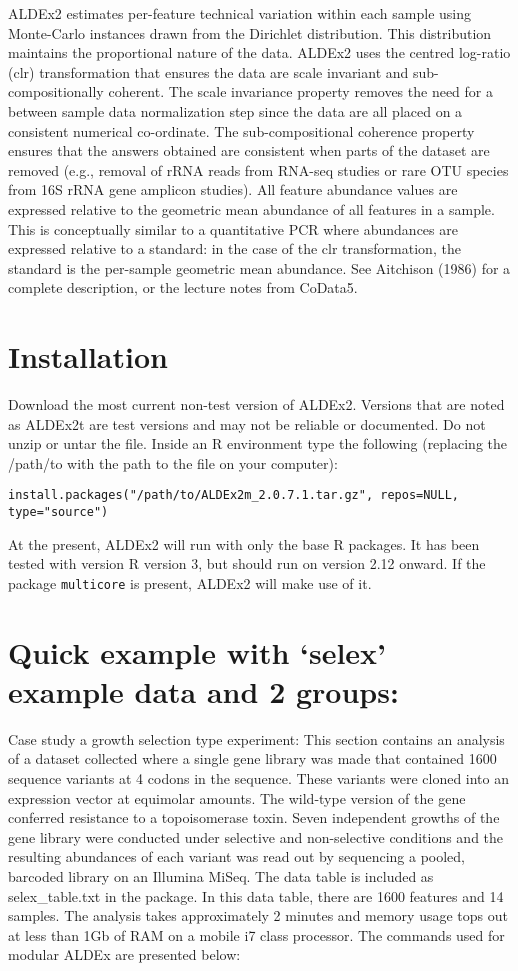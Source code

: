 \documentclass[11pt]{article}
\begin{document}
ALDEx2 estimates per-feature technical variation within each sample using Monte-Carlo instances drawn from the Dirichlet distribution. This distribution maintains the proportional nature of the data. ALDEx2 uses the centred log-ratio (clr) transformation that ensures the data are scale invariant and sub-compositionally coherent\cite{Aitchison:1986}. The scale invariance property removes the need for a between sample data normalization step since the data are all placed on a consistent numerical co-ordinate. The sub-compositional coherence property ensures that the answers obtained are consistent when parts of the dataset are removed (e.g., removal of rRNA reads from  RNA-seq studies or rare OTU species from 16S rRNA gene amplicon studies). All feature abundance values are expressed relative to the geometric mean abundance of all features in a sample. This is conceptually similar to a quantitative PCR where abundances are expressed relative to a standard: in the case of the clr transformation, the standard is the per-sample geometric mean abundance. See Aitchison (1986)\cite{Aitchison:1986} for a complete description, or the lecture notes from CoData5\cite{aitchisonconcise}.

\section{Installation}
Download the most current non-test version of ALDEx2. Versions that are noted as ALDEx2t are test versions and may not be reliable or documented. Do not unzip or untar the file. Inside an R environment type the following  (replacing the /path/to with the path to the file on your computer):
\begin{verbatim}
install.packages("/path/to/ALDEx2m_2.0.7.1.tar.gz", repos=NULL, type="source")
\end{verbatim}
At the present, ALDEx2 will run with only the base R packages. It has been tested with version R version 3, but should run on version 2.12 onward. If the package \texttt{multicore} is present, ALDEx2 will make use of it.

\section{Quick example with `selex' example data and 2 groups:}
Case study a growth selection type experiment\cite{mcmurrough:2014}: This section contains an analysis of a dataset collected where a single gene  library was made that contained 1600 sequence variants at 4 codons in the sequence. These variants were cloned into an expression vector at equimolar amounts. The wild-type version of the gene conferred resistance to a topoisomerase toxin. Seven independent growths of the gene library were conducted under selective and non-selective conditions and the resulting abundances of each variant was read out by sequencing a pooled, barcoded library on an Illumina MiSeq\cite{mcmurrough:2014}. The data table is included as selex\_table.txt in the package. In this data table, there are 1600 features and 14 samples. The analysis takes approximately 2 minutes and memory usage tops out at less than 1Gb of RAM on a mobile i7 class processor.  The commands used for modular ALDEx are presented below:
\end{document}
